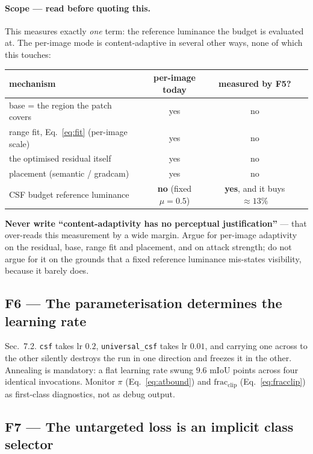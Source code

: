 \documentclass[11pt,a4paper]{article}
\begin{document}
\paragraph{Scope --- read before quoting this.}
This measures exactly \emph{one} term: the reference luminance the budget is
evaluated at. The per-image mode is content-adaptive in several other ways,
none of which this touches:
\begin{center}
\small
\begin{tabular}{@{}lccl@{}}
\toprule
mechanism & per-image today & measured by F5? \\
\midrule
base = the region the patch covers & yes & no \\
range fit, Eq.~\eqref{eq:fit} (per-image scale) & yes & no \\
the optimised residual itself & yes & no \\
placement (semantic / gradcam) & yes & no \\
CSF budget reference luminance & \textbf{no} (fixed $\mu=0.5$) & \textbf{yes}, and it buys $\approx13\%$ \\
\bottomrule
\end{tabular}
\end{center}
\textbf{Never write ``content-adaptivity has no perceptual justification''}
--- that over-reads this measurement by a wide margin. Argue for per-image
adaptivity on the residual, base, range fit and placement, and on attack
strength; do not argue for it on the grounds that a fixed reference
luminance mis-states visibility, because it barely does.

\subsection{F6 --- The parameterisation determines the learning rate}

Sec.~7.2. \texttt{csf} takes lr $0.2$, \texttt{universal\_csf} takes lr
$0.01$, and carrying one across to the other silently destroys the run in
one direction and freezes it in the other. Annealing is mandatory: a flat
learning rate swung $9.6$ mIoU points across four identical invocations.
Monitor $\pi$ (Eq.~\eqref{eq:atbound}) and $\mathrm{frac_{clip}}$
(Eq.~\eqref{eq:fracclip}) as first-class diagnostics, not as debug output.

\subsection{F7 --- The untargeted loss is an implicit class selector}
\end{document}
